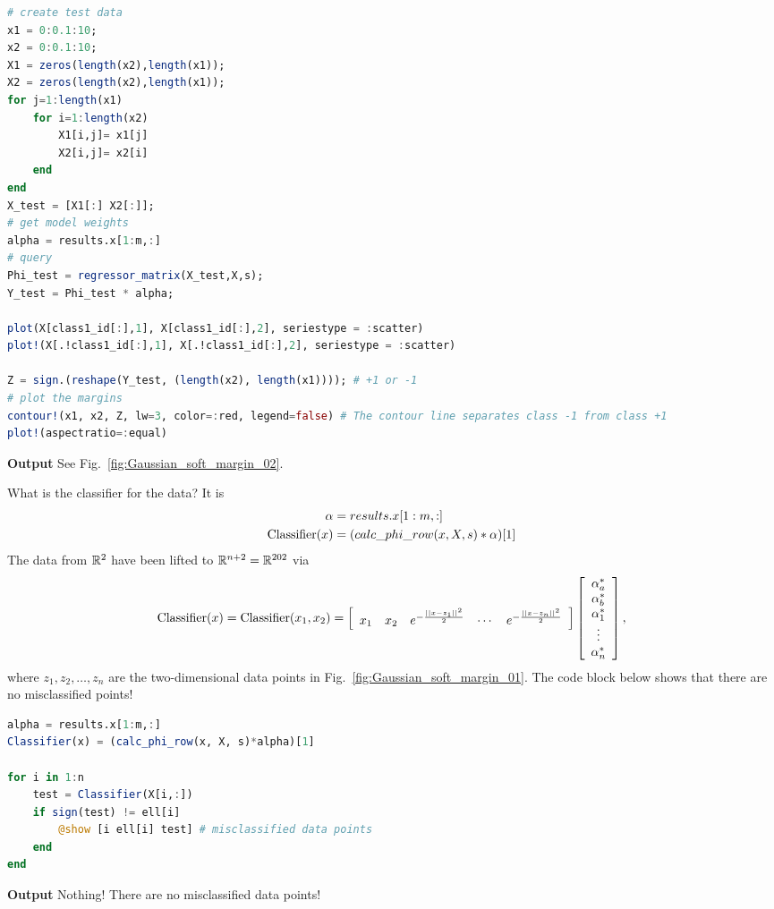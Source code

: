 \begin{lstlisting}[language=Julia,style=mystyle]
# create test data
x1 = 0:0.1:10;
x2 = 0:0.1:10;
X1 = zeros(length(x2),length(x1));
X2 = zeros(length(x2),length(x1));
for j=1:length(x1)
    for i=1:length(x2)
        X1[i,j]= x1[j]
        X2[i,j]= x2[i]
    end
end
X_test = [X1[:] X2[:]];
# get model weights
alpha = results.x[1:m,:]
# query
Phi_test = regressor_matrix(X_test,X,s);
Y_test = Phi_test * alpha;

plot(X[class1_id[:],1], X[class1_id[:],2], seriestype = :scatter)
plot!(X[.!class1_id[:],1], X[.!class1_id[:],2], seriestype = :scatter)

Z = sign.(reshape(Y_test, (length(x2), length(x1)))); # +1 or -1
# plot the margins
contour!(x1, x2, Z, lw=3, color=:red, legend=false) # The contour line separates class -1 from class +1 
plot!(aspectratio=:equal)
\end{lstlisting}
\textbf{Output} 
See Fig.~\ref{fig:Gaussian_soft_margin_02}.\\

\begin{remark} What is the classifier for the data? It is 
$$ \begin{aligned} \alpha & = results.x[1:m,:] \\
{\rm Classifier}(x) &= (calc\_phi\_row(x, X, s)*\alpha)[1]  \end{aligned}$$   
The data from $\mathbb R^2$ have been lifted to $\mathbb R^{n+2} = \mathbb R^{202}$ via
$${\rm Classifier}(x) = {\rm Classifier}(x_1, x_2) = \left[ \begin{array}{ccccc}x_1 & x_2 & e^{-\frac{||x-z_1||^2}{2} }& \cdots & e^{-\frac{||x-z_n||^2}{2}} \end{array} \right] \left[ \begin{array}{c} \alpha^\ast_a \\ \alpha^\ast_b \\ \alpha^\ast_1 \\ \vdots \\ \alpha^\ast_n  \end{array} \right], $$
where $z_1, z_2, \ldots, z_n$ are the two-dimensional data points in Fig.~\ref{fig:Gaussian_soft_margin_01}. The code block below shows that there are no misclassified points! 
\end{remark}


\begin{lstlisting}[language=Julia,style=mystyle]
alpha = results.x[1:m,:]
Classifier(x) = (calc_phi_row(x, X, s)*alpha)[1]

for i in 1:n
    test = Classifier(X[i,:])
    if sign(test) != ell[i]
        @show [i ell[i] test] # misclassified data points
    end    
end
\end{lstlisting}
\textbf{Output} 
Nothing! There are no misclassified data points!


